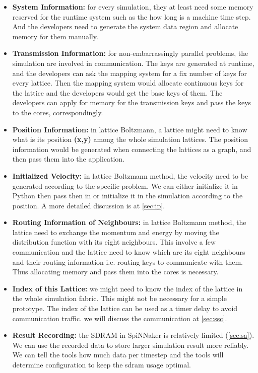 \begin{itemize}
    \item \textbf{System Information:} for every simulation, they at least need some memory reserved for the runtime system such as the how long is a machine time step. And the developers need to generate the system data region and allocate memory for them manually.
    
    \item \textbf{Transmission Information:} for non-embarrassingly parallel problems, the simulation are involved in communication. The keys are generated at runtime, and the developers can ask the mapping system for a fix number of keys for every lattice. Then the mapping system would allocate continuous keys for the lattice and the developers would get the base keys of them. The developers can apply for memory for the transmission keys and pass the keys to the cores, correspondingly.

    \item \textbf{Position Information:} in lattice Boltzmann, a lattice might need to know what is its position \textbf{(x,y)} among the whole simulation lattices. The position information would be generated when connecting the lattices as a graph, and then pass them into the application.
    
    \item \textbf{Initialized Velocity:} in lattice Boltzmann method, the velocity need to be generated according to the specific problem. We can either initialize it in Python then pass then in or initialize it in the simulation according to the position. A more detailed discussion is at \ref{sec:ip}.
    
    \item \textbf{Routing Information of Neighbours:} in lattice Boltzmann method, the lattice need to exchange the momentum and energy by moving the distribution function with its eight neighbours. This involve a few communication and the lattice need to know which are its eight neighbours and their routing information i.e. routing keys to communicate with them. Thus allocating memory and pass them into the cores is necessary. 
    
    \item \textbf{Index of this Lattice:} we might need to know the index of the lattice in the whole simulation fabric. This might not be necessary for a simple prototype. The index of the lattice can be used as a timer delay to avoid communication traffic. we will discuss the communication at \ref{sec:ssc}.
    
    \item \textbf{Result Recording:} the SDRAM in SpiNNaker is relatively limited (\ref{sec:sa}). We can use the recorded data to store larger simulation result more reliably. We can tell the tools how much data per timestep and the tools will determine configuration to keep the sdram usage optimal.
\end{itemize}

